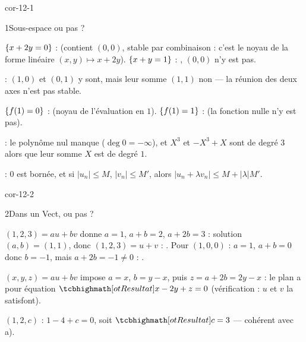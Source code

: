 
\corrigesSouples

\begin{blocLivre}{cor-12-1}
\begin{corrige}{1}{Sous-espace ou pas ?}
\begin{questions}
  \item $\left\{x+2y=0\right\}$ :  (contient $(0,0)$, stable par
    combinaison : c'est le noyau de la forme linéaire $(x,y)\mapsto x+2y$).
    $\left\{x+y=1\right\}$ : , $(0,0)$ n'y est pas.
  \item {} : $(1,0)$ et $(0,1)$ y sont, mais leur somme
    $(1,1)$ non — la réunion des deux axes n'est pas stable.
  \item $\left\{f(1)=0\right\}$ :  (noyau de l'évaluation en $1$).
    $\left\{f(1)=1\right\}$ :  (la fonction nulle n'y est pas).
  \item {} : le polynôme nul manque ($\deg0=-\infty$), et
    $X^{3}$ et $-X^{3}+X$ sont de degré $3$ alors que leur somme $X$ est de
    degré $1$.
  \item {} : $0$ est bornée, et si $|u_n|\leqslant M$,
    $|v_n|\leqslant M'$, alors $|u_n+\lambda v_n|\leqslant M+|\lambda|M'$.
\end{questions}
\end{corrige}
\end{blocLivre}

\begin{blocLivre}{cor-12-2}
\begin{corrige}{2}{Dans un Vect, ou pas ?}
\begin{questions}
  \item $(1,2,3)=au+bv$ donne $a=1$, $a+b=2$, $a+2b=3$ : solution
    $(a,b)=(1,1)$, donc $(1,2,3)=u+v$ : . Pour $(1,0,0)$ :
    $a=1$, $a+b=0$ donc $b=-1$, mais $a+2b=-1\neq0$ : .
  \item $(x,y,z)=au+bv$ impose $a=x$, $b=y-x$, puis
    $z=a+2b=2y-x$ : le plan a pour équation
    $\res{x-2y+z=0}$ (vérification : $u$ et $v$ la satisfont).
  \item $(1,2,c)$ : $1-4+c=0$, soit $\res{c=3}$ — cohérent avec a).
\end{questions}
\end{corrige}
\end{blocLivre}

